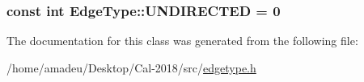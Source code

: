 \subsubsection[{\texorpdfstring{U\+N\+D\+I\+R\+E\+C\+T\+ED}{UNDIRECTED}}]{\setlength{\rightskip}{0pt plus 5cm}const int Edge\+Type\+::\+U\+N\+D\+I\+R\+E\+C\+T\+ED = 0\hspace{0.3cm}{\ttfamily [static]}}\hypertarget{classEdgeType_a6533cc56d05c288a550b9980b66c9317}{}\label{classEdgeType_a6533cc56d05c288a550b9980b66c9317}


The documentation for this class was generated from the following file\+:\begin{DoxyCompactItemize}
\item 
/home/amadeu/\+Desktop/\+Cal-\/2018/src/\hyperlink{edgetype_8h}{edgetype.\+h}\end{DoxyCompactItemize}
